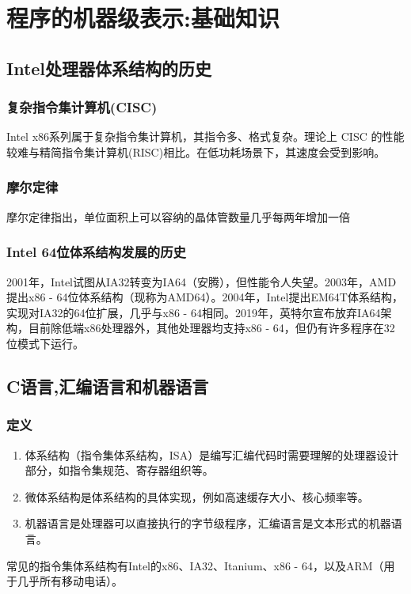 \section{程序的机器级表示:基础知识}
\subsection{Intel处理器体系结构的历史}

\subsubsection{复杂指令集计算机(CISC)}
Intel x86系列属于复杂指令集计算机，其指令多、格式复杂。理论上 CISC 的性能较难与精简指令集计算机(RISC)相比。在低功耗场景下，其速度会受到影响。


\subsubsection{摩尔定律}
摩尔定律指出，单位面积上可以容纳的晶体管数量几乎每两年增加一倍


\subsubsection{Intel 64位体系结构发展的历史}
2001年，Intel试图从IA32转变为IA64（安腾），但性能令人失望。2003年，AMD提出x86 - 64位体系结构（现称为AMD64）。2004年，Intel提出EM64T体系结构，实现对IA32的64位扩展，几乎与x86 - 64相同。2019年，英特尔宣布放弃IA64架构，目前除低端x86处理器外，其他处理器均支持x86 - 64，但仍有许多程序在32位模式下运行。
\subsection{C语言,汇编语言和机器语言}
\subsubsection{定义}
\begin{enumerate}
    \item 体系结构（指令集体系结构，ISA）是编写汇编代码时需要理解的处理器设计部分，如指令集规范、寄存器组织等。
    \item 微体系结构是体系结构的具体实现，例如高速缓存大小、核心频率等。
    \item 机器语言是处理器可以直接执行的字节级程序，汇编语言是文本形式的机器语言。
\end{enumerate}
常见的指令集体系结构有Intel的x86、IA32、Itanium、x86 - 64，以及ARM（用于几乎所有移动电话）。

